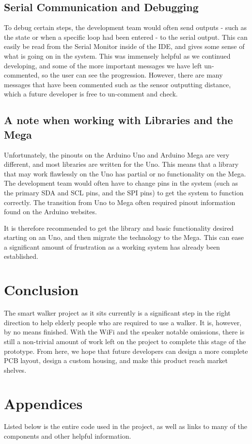 \documentclass{article}
\begin{document}
\subsection{Serial Communication and Debugging}
To debug certain steps, the development team would often send outputs - such as the state or when a specific loop had been entered - to the serial output. This can easily be read from the Serial Monitor inside of the IDE, and gives some sense of what is going on in the system. This was immensely helpful as we continued developing, and some of the more important messages we have left un-commented, so the user can see the progression. However, there are many messages that have been commented such as the sensor outputting distance, which a future developer is free to un-comment and check. 

\subsection{A note when working with Libraries and the Mega}
Unfortunately, the pinouts on the Arduino Uno and Arduino Mega are very different, and most libraries are written for the Uno. This means that a library that may work flawlessly on the Uno has partial or no functionality on the Mega. The development team would often have to change pins in the system (such as the primary SDA and SCL pins, and the SPI pins) to get the system to function correctly. The transition from Uno to Mega often required pinout information found on the Arduino websites.

It is therefore recommended to get the library and basic functionality desired starting on an Uno, and then migrate the technology to the Mega. This can ease a significant amount of frustration as a working system has already been established. 

\section{Conclusion}
The smart walker project as it sits currently is a significant step in the right direction to help elderly people who are required to use a walker. It is, however, by no means finished. With the WiFi and the speaker notable omissions, there is still a non-trivial amount of work left on the project to complete this stage of the prototype. From here, we hope that future developers can design a more complete PCB layout, design a custom housing, and make this product reach market shelves.

\section{Appendices}
Listed below is the entire code used in the project, as well as links to many of the components and other helpful information. 
\end{document}
